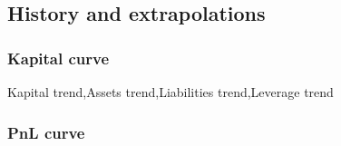 \documentclass[8pt]{article} %
\begin{document}
\subsection{History and extrapolations}

\subsubsection{Kapital curve}
Kapital trend,Assets trend,Liabilities trend,Leverage trend\\


\subsubsection{PnL curve}
%


%

\end{document}
